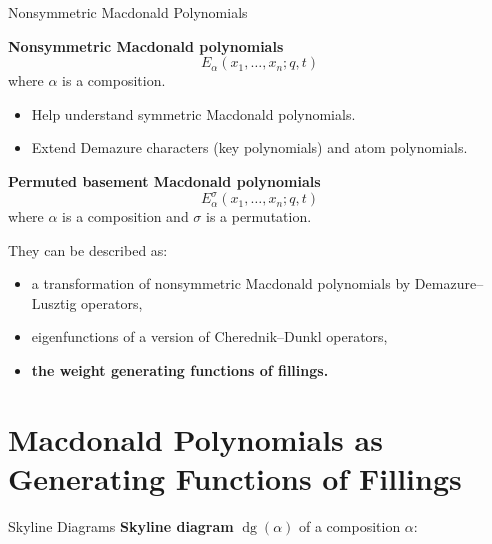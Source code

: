 \documentclass[aspectratio = 1609]{beamer}
\theoremstyle{definition}
\theoremstyle{plain} %
\DeclareMathOperator{\dg}{dg}
\begin{document}
\begin{frame}{Nonsymmetric Macdonald Polynomials}
  \setlength{\abovedisplayskip}{2pt}
  \setlength{\belowdisplayskip}{2pt}
  \setlength{\abovedisplayshortskip}{2pt}
  \setlength{\belowdisplayshortskip}{2pt}

  \textbf{Nonsymmetric Macdonald polynomials} \hfill \parencite{Mac96}
  \[E_\alpha(x_1, \dots, x_n; q, t)\]
  where \(\alpha\) is a composition.
  \begin{itemize}
    \small
    \item Help understand symmetric Macdonald polynomials.
    \item Extend Demazure characters (key polynomials) and atom polynomials.
  \end{itemize}

  \vspace{2em}
  \pause

  \textbf{Permuted basement Macdonald polynomials} \hfill \parencite{Fer11}
  \[E_\alpha^\sigma(x_1, \dots, x_n; q, t)\]
  where \(\alpha\) is a composition and \(\sigma\) is a permutation.

  \vspace{1em}

  They can be described as:
  \begin{itemize}
    \setlength{\itemsep}{.5em}
    \item a transformation of nonsymmetric Macdonald polynomials by Demazure--Lusztig operators,
    \item eigenfunctions of a version of Cherednik--Dunkl operators,
    \item \textbf<3>{\textcolor<3>{red!50!black}{the weight generating functions of fillings.}}
  \end{itemize}
\end{frame}

\part{Macdonald Polynomials as \\ Generating Functions of Fillings}

\begin{frame}{Skyline Diagrams}
    \textbf{Skyline diagram} \(\dg(\alpha)\) of a composition \(\alpha\):
    \begin{center}
    \end{center}
\end{frame}
\end{document}
